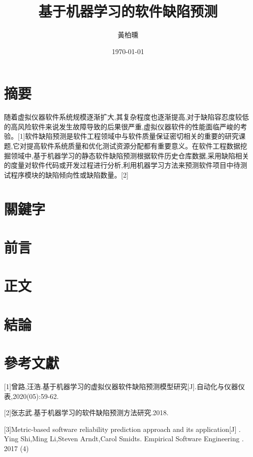 \documentclass[12pt, a4paper]{article}
\author{黃柏曛}
\date{\today}
\title{基于机器学习的软件缺陷预测}
\begin{document}
\maketitle

\section{摘要}

随着虚拟仪器软件系统规模逐渐扩大,其复杂程度也逐渐提高,对于缺陷容忍度较低的高风险软件来说发生故障导致的后果很严重,虚拟仪器软件的性能面临严峻的考验。[1]软件缺陷预测是软件工程领域中与软件质量保证密切相关的重要的研究课题,它对提高软件系统质量和优化测试资源分配都有重要意义。在软件工程数据挖掘领域中,基于机器学习的静态软件缺陷预测根据软件历史仓库数据,采用缺陷相关的度量对软件代码或开发过程进行分析,利用机器学习方法来预测软件项目中待测试程序模块的缺陷倾向性或缺陷数量。[2]

\section{關鍵字}

\section{前言}

\section{正文}

\section{結論}

\section{參考文獻}

[1]曾路,汪浩.基于机器学习的虚拟仪器软件缺陷预测模型研究[J].自动化与仪器仪表,2020(05):59-62.

[2]张志武.基于机器学习的软件缺陷预测方法研究.2018.

[3]Metric-based software reliability prediction approach and its application[J] . Ying Shi,Ming Li,Steven Arndt,Carol Smidts.  Empirical Software Engineering . 2017 (4) 
\end{document}

